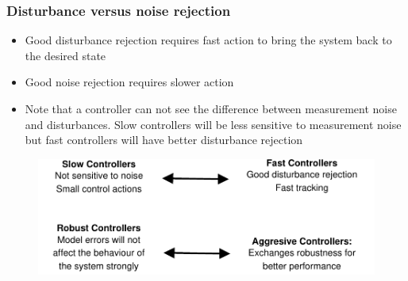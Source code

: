 \begin{frame}
	\frametitle{Disturbance versus noise rejection}
	\begin{block}{}
		\begin{itemize}
			\item Good disturbance rejection requires fast action to bring the system back to the desired state
			\item Good noise rejection requires slower action
			\item Note that a controller can not see the difference between measurement noise and disturbances. Slow controllers will be less sensitive to measurement noise but fast controllers will have better disturbance rejection
		\end{itemize}
	\end{block}
\end{frame}

\begin{frame}
	\begin{figure}
		\centering
		\includegraphics[width=1.1\linewidth]{comparison}
		\caption{}
		\label{fig:comparison}
	\end{figure}
\end{frame}